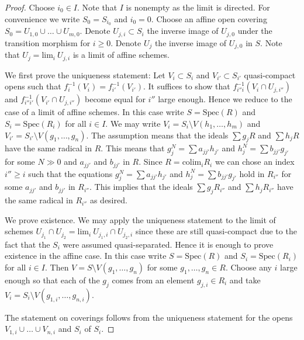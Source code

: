 \begin{proof}
Choose $i_0 \in I$. Note that $I$ is nonempty as the limit is directed.
For convenience we write $S_0 = S_{i_0}$ and $i_0 = 0$.
Choose an affine open covering $S_0 = U_{1, 0} \cup \ldots \cup U_{m, 0}$.
Denote $U_{j, i} \subset S_i$ the inverse image of $U_{j, 0}$
under the transition morphism for $i \geq 0$.
Denote $U_j$ the inverse image of $U_{j, 0}$ in $S$.
Note that $U_j = \text{lim}_i\ U_{j, i}$ is a limit of affine
schemes.

\medskip\noindent
We first prove the uniqueness statement: Let
$V_i \subset S_i$ and $V_{i'} \subset S_{i'}$
quasi-compact opens such that $f_i^{-1}(V_i) = f_{i'}^{-1}(V_{i'})$.
It suffices to show that $f_{i''i}^{-1}(V_i \cap U_{j, i''})$ and
$f_{i''i'}^{-1}(V_{i'} \cap U_{j, i''})$ become equal
for $i''$ large enough. Hence we reduce to the case
of a limit of affine schemes. In this case write
$S = \text{Spec}(R)$ and $S_i = \text{Spec}(R_i)$ for all $i \in I$.
We may write $V_i = S_i \setminus V(h_1, \ldots, h_m)$
and $V_{i'} = S_{i'} \setminus V(g_1, \ldots, g_n)$.
The assumption means that the ideals
$\sum g_jR$ and $\sum h_jR$ have the same radical
in $R$. This means that $g_j^N = \sum a_{jj'}h_{j'}$ and
$h_j^N = \sum b_{jj'} g_{j'}$ for some $N \gg 0$ and $a_{jj'}$
and $b_{jj'}$ in $R$.
Since $R = \text{colim}_i R_i$ we can chose an index
$i'' \geq i$ such that the equations
$g_j^N = \sum a_{jj'}h_{j'}$ and
$h_j^N = \sum b_{jj'} g_{j'}$ hold in $R_{i''}$ for some
$a_{jj'}$ and $b_{jj'}$ in $R_{i''}$. This implies that
the ideals $\sum g_jR_{i''}$ and $\sum h_jR_{i''}$ have the same radical
in $R_{i''}$ as desired.

\medskip\noindent
We prove existence. We may apply the uniqueness statement to
the limit of schemes
$U_{j_1} \cap U_{j_2} = \text{lim}_i\ U_{j_1, i} \cap U_{j_2, i}$
since these are still quasi-compact due to the fact that the
$S_i$ were assumed quasi-separated.
Hence it is enough to prove existence in the affine case.
In this case write $S = \text{Spec}(R)$ and $S_i = \text{Spec}(R_i)$
for all $i \in I$. Then $V = S \setminus V(g_1, \ldots, g_n)$
for some $g_1, \ldots, g_n \in R$. Choose any $i$ large enough
so that each of the $g_j$ comes from an element $g_{j, i} \in R_i$
and take $V_i = S_i \setminus V(g_{1, i}, \ldots, g_{n, i})$.

\medskip\noindent
The statement on coverings follows from the uniqueness statement
for the opens $V_{1, i} \cup \ldots \cup V_{n, i}$ and $S_i$ of $S_i$.
\end{proof}

